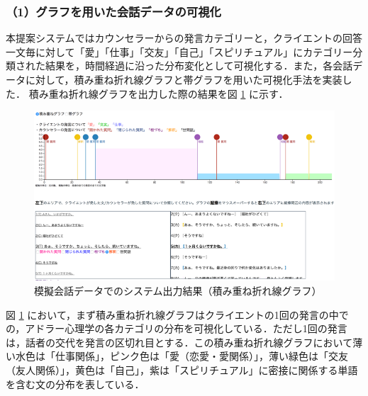\documentclass[shuuron]{kuee}
\begin{document}
\subsubsection{（1）グラフを用いた会話データの可視化}
本提案システムではカウンセラーからの発言カテゴリーと，クライエントの回答一文毎に対して「愛」「仕事」「交友」「自己」「スピリチュアル」にカテゴリー分類された結果を，時間経過に沿った分布変化として可視化する．また，各会話データに対して，積み重ね折れ線グラフと帯グラフを用いた可視化手法を実装した．
積み重ね折れ線グラフを出力した際の結果を図
\ref{fig:6_1}
に示す．
\begin{figure}
  \begin{center}
    \includegraphics[width=\linewidth]{6_1.png}
  \end{center}
  \caption{模擬会話データでのシステム出力結果（積み重ね折れ線グラフ）}
  \label{fig:6_1}
\end{figure}




図
\ref{fig:6_1}
において，まず積み重ね折れ線グラフはクライエントの1回の発言の中での，アドラー心理学の各カテゴリの分布を可視化している．ただし1回の発言は，話者の交代を発言の区切れ目とする．この積み重ね折れ線グラフにおいて薄い水色は「仕事関係」，ピンク色は「愛（恋愛・愛関係）」，薄い緑色は「交友（友人関係）」，黄色は「自己」，紫は「スピリチュアル」に密接に関係する単語を含む文の分布を表している．
\end{document}

